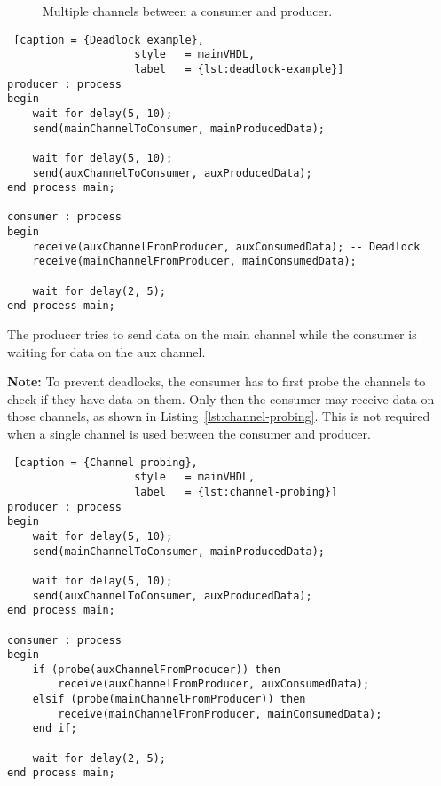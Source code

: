 \documentclass{report}
\begin{document}
\begin{figure}[H]
\centering
{}
\caption{Multiple channels between a consumer and producer.}\label{fig:multiple-channels}
\end{figure}

\begin{lstlisting} [caption = {Deadlock example},
                    style   = mainVHDL,
                    label   = {lst:deadlock-example}]
producer : process
begin
    wait for delay(5, 10);
    send(mainChannelToConsumer, mainProducedData);

    wait for delay(5, 10);
    send(auxChannelToConsumer, auxProducedData);
end process main;

consumer : process
begin
    receive(auxChannelFromProducer, auxConsumedData); -- Deadlock
    receive(mainChannelFromProducer, mainConsumedData);

    wait for delay(2, 5);
end process main;
\end{lstlisting}

The producer tries to send data on the main channel while the consumer is
waiting for data on the aux channel.

\textbf{Note:} To prevent deadlocks, the consumer has to first probe the
channels to check if they have data on them. Only then the consumer may receive
data on those channels, as shown in Listing~\ref{lst:channel-probing}. This is
not required when a single channel is used between the consumer and producer.

\begin{lstlisting} [caption = {Channel probing},
                    style   = mainVHDL,
                    label   = {lst:channel-probing}]
producer : process
begin
    wait for delay(5, 10);
    send(mainChannelToConsumer, mainProducedData);

    wait for delay(5, 10);
    send(auxChannelToConsumer, auxProducedData);
end process main;

consumer : process
begin
    if (probe(auxChannelFromProducer)) then
        receive(auxChannelFromProducer, auxConsumedData);
    elsif (probe(mainChannelFromProducer)) then
        receive(mainChannelFromProducer, mainConsumedData);
    end if;

    wait for delay(2, 5);
end process main;
\end{lstlisting}
\end{document}
